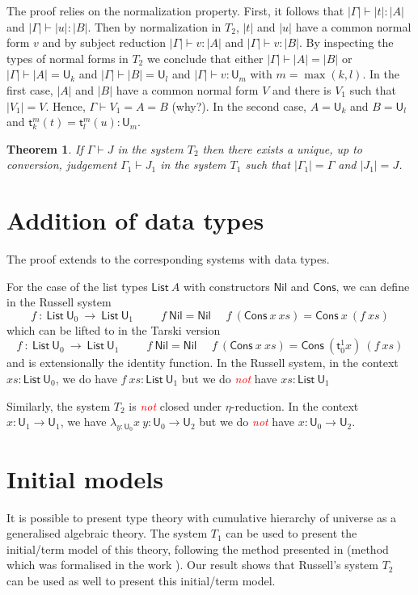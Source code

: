 \documentclass[11pt,a4paper]{article}
\newtheorem{theorem}{Theorem}[section]
\theoremstyle{definition}
\def\UU{\mathsf{U}}
\def\List{\mathsf{List}}
\def\Cons{\mathsf{Cons}}
\def\Nil{\mathsf{Nil}}
\newcommand{\sT}{\mathsf{t}}
\newcommand{\EMP}[1]{\emph{\textcolor{red}{#1}}}
\begin{document}
The proof relies on the normalization property. First, it follows that $|\Gamma | \vdash |t|:|A|$ and $|\Gamma | \vdash |u|:|B|$. Then by normalization in $T_2$, $| t |$ and $| u |$ have a common normal form $v$  and by subject reduction
$|\Gamma | \vdash v : |A|$ and $|\Gamma | \vdash v : |B|$. By inspecting the types of normal forms in $T_2$ we conclude that either $|\Gamma | \vdash |A| = |B|$ or $|\Gamma | \vdash |A| = \UU_k$ and $|\Gamma | \vdash |B| = \UU_l$ and $|\Gamma | \vdash v :\UU_m$ with $m = \max(k,l)$. In the first case,  $|A|$ and $|B|$ have a common normal form $V$ and there is $V_1$ such that $| V_1 |  = V$. Hence, $\Gamma \vdash V_1 = A = B$ (why?). In the second case, $A = \UU_k$ and $B = \UU_l$ and $\sT_k^m(t) = \sT_l^m(u):\UU_m$.

\begin{theorem}
  If $\Gamma\vdash J$ in the system $T_2$ then there exists a unique, up to conversion, judgement $\Gamma_1\vdash J_1$
  in the system $T_1$ such that $|\Gamma_1| = \Gamma$ and $|J_1| = J$.
\end{theorem}

\section{Addition of data types}

The proof extends to the corresponding systems with data types.

For the case of the list types $\List~A$ with constructors $\Nil$ and $\Cons$, we can define in the Russell system
$$
f~:~\List~\UU_0~\rightarrow~\List~\UU_1~~~~~~~~~~~
f~\Nil = \Nil~~~~~~f~(\Cons~x~xs) = \Cons~x~(f~xs)
$$
which can be lifted to in the Tarski version
$$
f~:~\List~\UU_0~\rightarrow~\List~\UU_1~~~~~~~~~~~
f~\Nil = \Nil~~~~~~f~(\Cons~x~xs) = \Cons~(\sT_0^1 x)~(f~xs)
$$
and is extensionally the identity function.
In the Russell system, in the context  $xs:\List~\UU_0$,
we do have $f~xs:\List~\UU_1$ but we do \EMP{not} have $xs:\List~\UU_1$

\medskip

     Similarly, the system $T_2$ is \EMP{not} closed under $\eta$-reduction. In the context
     $x:\UU_1\rightarrow\UU_1$, 
     we have $\lambda_{y:\UU_0}x~y:\UU_0\rightarrow\UU_2$ but we do \EMP{not} have
     $x:\UU_0\rightarrow\UU_2$.




\section{Initial models}

It is possible to present type theory with cumulative hierarchy of universe as a generalised algebraic theory.
The system $T_1$ can be used to present the initial/term model of this theory, following the method presented in \cite{Streicher:semtt}
(method which was formalised in the work \cite{brunerie:initiality}).
Our result shows that Russell's system $T_2$ can be used as well to present this initial/term model.





\end{document}

